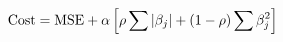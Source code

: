 \documentclass[preview]{standalone}
\begin{document}
\begin{align*}
\special{dvisvgm:raw <g id='unique000'>}\text{Cost} = \text{MSE} + \alpha \left[\rho \sum|\beta_j| + (1-\rho)\sum\beta_j^2\right]\special{dvisvgm:raw </g>}
\end{align*}
\end{document}
